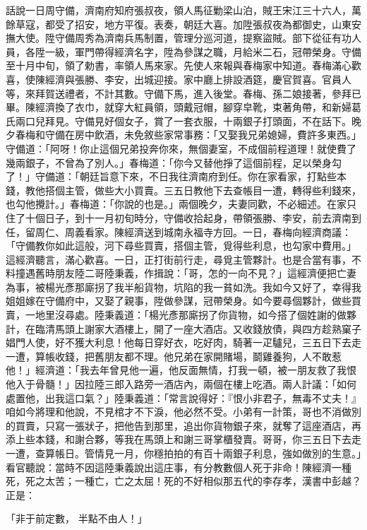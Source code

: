 \begin{showcontents}{}
話說一日周守備，濟南府知府張叔夜，領人馬征勦梁山泊，賊王宋江三十六人，萬餘草寇，都受了招安，地方平復。表奏，朝廷大喜。加陞張叔夜為都御史，山東安撫大使。陞守備周秀為濟南兵馬制置，管理分巡河道，提察盜賊。部下從征有功人員，各陞一級，軍門帶得經濟名字，陞為參謀之職，月給米二石，冠帶榮身。守備至十月中旬，領了勅書，率領人馬來家。先使人來報與春梅家中知道。春梅滿心歡喜，使陳經濟與張勝、李安，出城迎接。家中廳上排設酒筵，慶官賀喜。官員人等，來拜賀送禮者，不計其數。守備下馬，進入後堂。春梅、孫二娘接著，參拜已畢。陳經濟換了衣巾，就穿大紅員領，頭戴冠帽，腳穿皁靴，束著角帶，和新婦葛氏兩口兒拜見。守備見好個女子，賞了一套衣服，十兩銀子打頭面，不在話下。晚夕春梅和守備在房中飲酒，未免敘些家常事務：「又娶我兄弟媳婦，費許多東西。」守備道：「阿呀！你止這個兄弟投奔你來，無個妻室，不成個前程道理！就使費了幾兩銀子，不曾為了別人。」春梅道：「你今又替他掙了這個前程，足以榮身勾了！」守備道：「朝廷旨意下來，不日我往濟南府到任。你在家看家，打點些本錢，教他搭個主管，做些大小買賣。三五日教他下去查帳目一遭，轉得些利錢來，也勾他攪計。」春梅道：「你說的也是。」兩個晚夕，夫妻同歡，不必細述。在家只住了十個日子，到十一月初旬時分，守備收拾起身，帶領張勝、李安，前去濟南到任，留周仁、周義看家。陳經濟送到城南永福寺方回。一日，春梅向經濟商議：「守備教你如此這般，河下尋些買賣，搭個主管，覓得些利息，也勾家中費用。」這經濟聽言，滿心歡喜。一日，正打街前行走，尋覓主管夥計。也是合當有事，不料撞遇舊時朋友陸二哥陸秉義，作揖說：「哥，怎的一向不見？」這經濟便把亡妻為事，被楊光彥那廝拐了我半船貨物，坑陷的我一貧如洗。我如今又好了，幸得我姐姐嫁在守備府中，又娶了親事，陞做參謀，冠帶榮身。如今要尋個夥計，做些買賣，一地里沒尋處。陸秉義道：「楊光彥那廝拐了你貨物，如今搭了個姓謝的做夥計，在臨清馬頭上謝家大酒樓上，開了一座大酒店。又收錢放債，與四方趁熟窠子娼門人使，好不獲大利息！他每日穿好衣，吃好肉，騎著一疋驢兒，三五日下去走一遭，算帳收錢，把舊朋友都不理。他兄弟在家開賭場，鬬雞養狗，人不敢惹他！」經濟道：「我去年曾見他一遍，他反面無情，打我一頓，被一朋友救了我恨他入于骨髓！」因拉陸三郎入路旁一酒店內，兩個在樓上吃酒。兩人計議：「如何處置他，出我這口氣？」陸秉義道：「常言說得好：『恨小非君子，無毒不丈夫！』咱如今將理和他說，不見棺才不下淚，他必然不受。小弟有一計策，哥也不消做別的買賣，只寫一張狀子，把他告到那里，追出你貨物銀子來，就奪了這座酒店，再添上些本錢，和謝合夥，等我在馬頭上和謝三哥掌櫃發賣。哥哥，你三五日下去走一遭，查算帳日。管情見一月，你穩拍拍的有百十兩銀子利息，強如做別的生意。」看官聽說：當時不因這陸秉義說出這庄事，有分教數個人死于非命！陳經濟一種死，死之太苦；一種亡，亡之太屈！死的不好相似那五代的李存孝，漢書中彭越？正是：

「非于前定數，  半點不由人！」


\end{showcontents}
